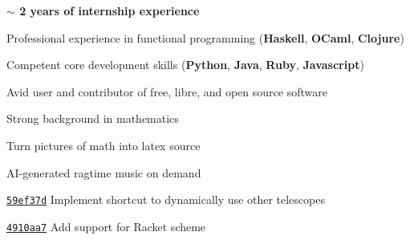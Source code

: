 
\begin{tightitemize}
\item \textbf{$\sim$ 2 years of internship experience}
    \item Professional experience in functional programming (\textbf{Haskell}, 
        \textbf{OCaml},
        \textbf{Clojure})
    \item Competent core development skills (\textbf{Python}, \textbf{Java}, 
    \textbf{Ruby}, \textbf{Javascript})
    \item Avid user and contributor of free, libre, and open source software
    \item Strong background in mathematics
\end{tightitemize}

\bigskip
{}

Turn pictures of math into latex source

\smalldivider

AI-generated ragtime music on demand

\smallskip




\href{https://github.com/nvim-lua/telescope.nvim/commit/59ef37ded43a77a4c0f35be434f1ea72a407ce84}{\texttt{59ef37d}} 
Implement shortcut to dynamically use other telescopes

\smalldivider

\href{https://github.com/ujihisa/repl.vim/commit/4910aa7d7b0c7abda92dcfdb4cde030fb839091d}{\texttt{4910aa7}} 
Add support for Racket scheme

\smallskip
{}

\smallskip
{}

